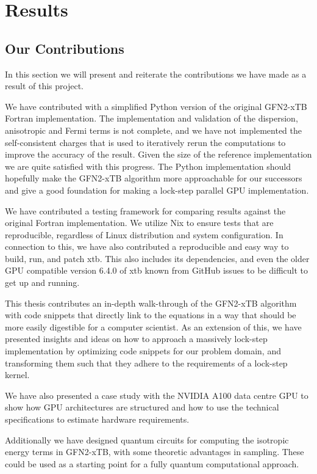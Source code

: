 \chapter{Results}

\section{Our Contributions}

In this section we will present and reiterate the contributions we have made as a result of this project.

We have contributed with a simplified Python version of the original GFN2-xTB Fortran implementation. The implementation and validation of the dispersion, anisotropic and Fermi terms is not complete, and we have not implemented the self-consistent charges that is used to iteratively rerun the computations to improve the accuracy of the result. Given the size of the reference implementation we are quite satisfied with this progress. The Python implementation should hopefully make the GFN2-xTB algorithm more approachable for our successors and give a good foundation for making a lock-step parallel GPU implementation.

We have contributed a testing framework for comparing results against the original Fortran implementation. We utilize Nix to ensure tests that are reproducible, regardless of Linux distribution and system configuration. In connection to this, we have also contributed a reproducible and easy way to build, run, and patch xtb. This also includes its dependencies, and even the older GPU compatible version 6.4.0 of xtb known from GitHub issues to be difficult to get up and running.

This thesis contributes an in-depth walk-through of the GFN2-xTB algorithm with code snippets that directly link to the equations in a way that should be more easily digestible for a computer scientist. As an extension of this, we have presented insights and ideas on how to approach a massively lock-step implementation by optimizing code snippets for our problem domain, and transforming them such that they adhere to the requirements of a lock-step kernel.

We have also presented a case study with the NVIDIA A100 data centre GPU to show how GPU architectures are structured and how to use the technical specifications to estimate hardware requirements.

Additionally we have designed quantum circuits for computing the isotropic energy terms in GFN2-xTB, with some theoretic advantages in sampling. These could be used as a starting point for a fully quantum computational approach. 


